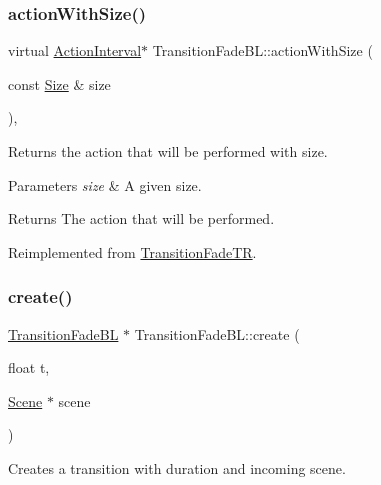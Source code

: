 \subsubsection{\texorpdfstring{action\+With\+Size()}{actionWithSize()}\hspace{0.1cm}{\footnotesize\ttfamily [2/2]}}
{\footnotesize\ttfamily virtual \hyperlink{classActionInterval}{Action\+Interval}$\ast$ Transition\+Fade\+B\+L\+::action\+With\+Size (\begin{DoxyParamCaption}\item[{const \hyperlink{classSize}{Size} \&}]{size }\end{DoxyParamCaption})\hspace{0.3cm}{\ttfamily [override]}, {\ttfamily [virtual]}}

Returns the action that will be performed with size.


\begin{DoxyParams}{Parameters}
{\em size} & A given size. \\
\hline
\end{DoxyParams}
\begin{DoxyReturn}{Returns}
The action that will be performed. 
\end{DoxyReturn}


Reimplemented from \hyperlink{classTransitionFadeTR_a371a39553335050a845c6743d20aac00}{Transition\+Fade\+TR}.

\mbox{\label{classTransitionFadeBL_a485a14c7e0402f080e983c04b7d76c24}} 
\subsubsection{\texorpdfstring{create()}{create()}\hspace{0.1cm}{\footnotesize\ttfamily [1/2]}}
{\footnotesize\ttfamily \hyperlink{classTransitionFadeBL}{Transition\+Fade\+BL} $\ast$ Transition\+Fade\+B\+L\+::create (\begin{DoxyParamCaption}\item[{float}]{t,  }\item[{\hyperlink{classScene}{Scene} $\ast$}]{scene }\end{DoxyParamCaption})\hspace{0.3cm}{\ttfamily [static]}}

Creates a transition with duration and incoming scene.


